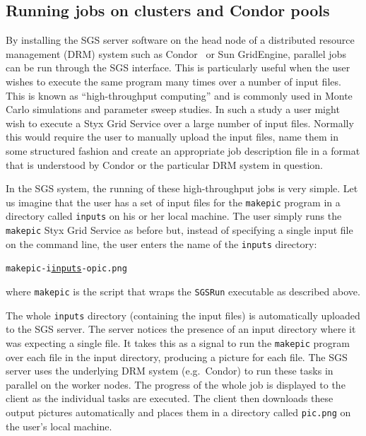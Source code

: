 \documentclass[a4paper]{article}
\begin{document}
\subsection{Running jobs on clusters and Condor pools}\label{sec:condor}

By installing the SGS server software on the head node of a distributed resource management (DRM) system such as Condor~\cite{condor} or Sun GridEngine, parallel jobs can be run through the SGS interface.  This is particularly useful when the user wishes to execute the same program many times over a number of input files.  This is known as ``high-throughput computing'' and is commonly used in Monte Carlo simulations and parameter sweep studies.  In such a study a user might wish to execute a Styx Grid Service over a large number of input files.  Normally this would require the user to manually upload the input files, name them in some structured fashion and create an appropriate job description file in a format that is understood by Condor or the particular DRM system in question.

In the SGS system, the running of these high-throughput jobs is very simple.  Let us imagine that the user has a set of input files for the \texttt{makepic} program in a directory called \texttt{inputs} on his or her local machine.  The user simply runs the \texttt{makepic} Styx Grid Service as before but, instead of specifying a single input file on the command line, the user enters the name of the \texttt{inputs} directory:

\begin{alltt}
   makepic -i \underline{inputs} -o pic.png
\end{alltt}

\noindent where \texttt{makepic} is the script that wraps the \texttt{SGSRun} executable as described above.

The whole \texttt{inputs} directory (containing the input files) is automatically uploaded to the SGS server.  The server notices the presence of an input directory where it was expecting a single file.  It takes this as a signal to run the \texttt{makepic} program over each file in the input directory, producing a picture for each file.  The SGS server uses the underlying DRM system (e.g.\ Condor) to run these tasks in parallel on the worker nodes.  The progress of the whole job is displayed to the client as the individual tasks are executed.  The client then downloads these output pictures automatically and places them in a directory called \texttt{pic.png} on the user's local machine.
\end{document}
